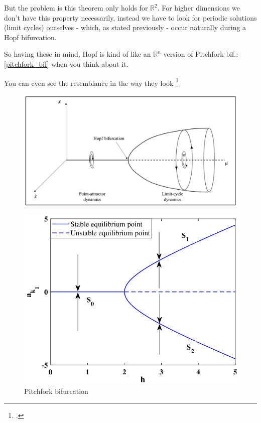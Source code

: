 But the problem is this theorem only holds for $\mathbb{R}^2$. For higher dimensions we don't have this property necessarily, instead we have to look for periodic solutions (limit cycles) ourselves - which, as stated previously - occur naturally during a Hopf bifurcation.

So having these in mind, Hopf is kind of like an $\mathbb{R}^n$ version of Pitchfork bif.: \ref{pitchfork_bif} when you think about it.

You can even see the resemblance in the way they look \footcite{brainsci10080536}

\begin{figure}[H]
	\includegraphics[width=13cm]{math_pics/hopf-bif-pic.png}
	\centering
\end{figure}

\begin{figure}[H]
	\includegraphics[width=13cm]{math_pics/pitchfork-photo.png}
	\centering
	\caption{Pitchfork bifurcation \cite{Yang2020}}
\end{figure}

